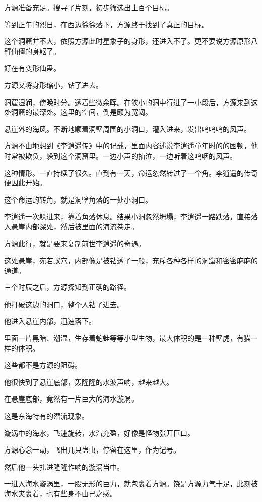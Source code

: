 \begin{this_body}
方源准备充足。搜寻了片刻，初步筛选出上百个目标。

等到正午的烈日，在西边徐徐落下，方源终于找到了真正的目标。

这个洞窟并不大，依照方源此时星象子的身形，还进入不了。更不要说方源原形八臂仙僵的身躯了。

好在有变形仙蛊。

方源又将身形缩小，钻了进去。

洞窟湿润，傍晚时分。透着些微余晖。在狭小的洞中行进了一小段后，方源来到这处洞窟的最深处。这里的空间，倒是颇为宽阔。

悬崖外的海风。不断地顺着洞壁周围的小洞口，灌入进来，发出呜呜呜的风声。

方源不由地想到《李逍遥传》中的记载，里面内容述说李逍遥童年时的的困顿，他时常被欺负，躲到这个洞窟里。一边小声的抽泣，一边听着这呜咽的风声。

这种情形。一直持续了很久。直到有一天，命运忽然转过了一个角。李逍遥的传奇便因此开始。

这个命运的转角，就是洞壁角落的一处小洞口。

李逍遥一次躲进来，靠着角落休息。结果小洞忽然坍塌，李逍遥一路跌落，直接落入悬崖内部深处，然后被里面的海流卷走。

方源此行，就是要来复制前世李逍遥的奇遇。

这处悬崖，宛若蚁穴，内部像是被钻透了一般，充斥各种各样的洞窟和密密麻麻的通道。

三个时辰之后，方源探知到正确的路径。

他打破这边的洞口，整个人钻了进去。

他进入悬崖内部，迅速落下。

里面一片黑暗、潮湿，生存着蛇蛙等等小型生物，最大体积的是一种壁虎，有猫一样的体积。

这些都不是方源的阻碍。

他很快到了悬崖底部，轰隆隆的水波声响，越来越大。

在悬崖底部，竟然有一片巨大的海水漩涡。

这是东海特有的潜流现象。

漩涡中的海水，飞速旋转，水汽充盈，好像是怪物张开巨口。

方源心念一动，飞出几只蛊虫，停留在这里，作为记号。

然后他一头扎进隆隆作响的漩涡当中。

一进入海水漩涡里，一股无形的巨力，就包裹着方源。饶是方源力气十足，此刻被海水夹裹着，也有些身不由己之感。


\end{this_body}
